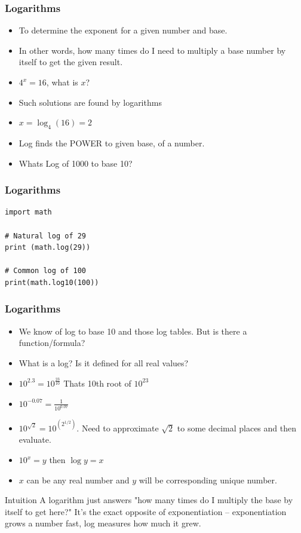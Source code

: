  \begin{frame}[fragile]\frametitle{Logarithms}

\begin{itemize}
\item To determine the exponent for a given number and base. 
\item In other words, how many times do I need to multiply a base number by itself to get the given result.
\item $4^x =16$, what is $x$?
\item Such solutions are found by logarithms
\item $x = \log_4 (16) = 2$
\item Log finds the POWER to given base, of a number.
\item Whats Log of 1000 to base 10?
\end{itemize}
\end{frame}

 \begin{frame}[fragile]\frametitle{Logarithms}
\begin{lstlisting}
import math

# Natural log of 29
print (math.log(29))

# Common log of 100
print(math.log10(100))
\end{lstlisting}
\end{frame}


 \begin{frame}[fragile]\frametitle{Logarithms}
\begin{itemize}
\item We know of log to base 10 and those log tables. But is there  a function/formula?
\item What is a log? Is it defined for all real values?
\item $10^{2.3} = 10^{\frac{23}{10}}$ Thats 10th root of $10^{23}$
\item $10^{-0.07} = \frac{1}{10^{0.07}}$
\item $10^{\sqrt{2}} = 10^{(2^{1/2})}$. Need to approximate $\sqrt{2}$ to some decimal places and then evaluate.
\item $10^x= y$ then $\log y = x$
\item $x$ can be any real number and $y$ will be corresponding unique number.
\end{itemize}

\begin{block}{Intuition}
A logarithm just answers "how many times do I multiply the base by itself to get here?" It's the exact opposite of exponentiation -- exponentiation grows a number fast, log measures how much it grew.
\end{block}
\end{frame}

